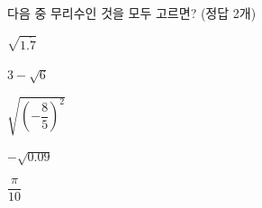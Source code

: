 다음 중 무리수인 것을 모두 고르면? (정답 2개)
\begin{choices32}{\rule[-3ex]{0pt}{8ex}$\sqrt{1.\dot{7}}$}{\rule[-3ex]{0pt}{8ex}$3-\sqrt{6}$}{\rule[-3ex]{0pt}{8ex}$\sqrt{\left(-\dfrac{8}{5}\right)^2}$}{\rule[-3ex]{0pt}{8ex}$-\sqrt{0.09}$}{\rule[-3ex]{0pt}{8ex}$\dfrac{\pi}{10}$}\end{choices32}
